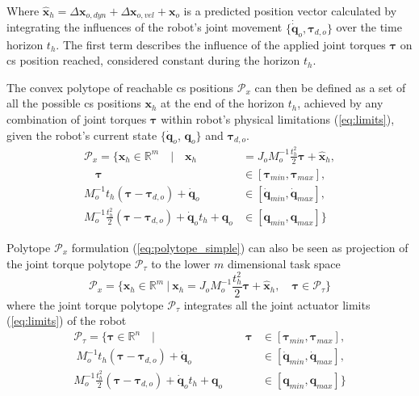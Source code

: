 Where $\hat{\bm{x}}_{h}\! =\!\Delta \bm{x}_{o,dyn}\! +\! \Delta \bm{x}_{o,vel} + \bm{x}_{o}$ is a predicted position vector calculated by integrating the influences of the robot's joint movement $\{\dot{\dot{\bm{q}}}_o,\bm{\tau}_{d,o}\}$ over the time horizon $t_h$. The first term describes the influence of the applied joint torques $\bm{\tau}$ on \gls{cs} position reached, considered constant during the horizon $t_h$.

The convex polytope of reachable \gls{cs} positions $\mathcal{P}_x$ can then be defined as a set of all the possible \gls{cs} positions $\bm{x}_{h}$ at the end of the horizon $t_h$, achieved by any combination of joint torques $\bm{\tau}$ within robot's physical limitations (\ref{eq:limits}), given the robot's current state $\{\dot{\bm{q}}_o$, $\bm{q}_o\}$ and $\bm{\tau}_{d,o}$.
\begin{equation}
\begin{split}
    \mathcal{P}_x= \{ \bm{x}_{h} \in \mathbb{R}^m \quad| \quad \bm{x}_{h} &= J_o M_o^{-1}\frac{t_h^2}{2}\bm{\tau} + \hat{\bm{x}}_{h},\\
    \quad \bm{\tau} &\in \left[\bm{\tau}_{min},\bm{\tau}_{max}\right],\\
   M_o^{-1}t_h (\bm{\tau} - \bm{\tau}_{d,o}) + \dot{\bm{q}}_o &\in \left[\dot{\bm{q}}_{min},\dot{\bm{q}}_{max}\right],\\
   M_o^{-1}\frac{t_h^2}{2}(\bm{\tau} - \bm{\tau}_{d,o}) +  \dot{\bm{q}}_ot_h + \bm{q}_o &\in \left[\bm{q}_{min},\bm{q}_{max}\right] \}
\end{split} 
\label{eq:polytope_simple}
\end{equation}

Polytope $\mathcal{P}_x$ formulation (\ref{eq:polytope_simple}) can also be seen as projection of the joint torque polytope $\mathcal{P}_\tau$ to the lower $m$ dimensional task space
\begin{equation}
    \mathcal{P}_x= \{ \bm{x}_{h} \in \mathbb{R}^m ~| ~ \bm{x}_{h} = J_o M_o^{-1}\frac{t_h^2}{2}\bm{\tau} + \hat{\bm{x}}_{h},\quad \bm{\tau}\in\mathcal{P}_\tau\}
\end{equation}
where the joint torque polytope $\mathcal{P}_\tau$ integrates all the joint actuator limits (\ref{eq:limits}) of the robot
\begin{equation}
\begin{split}
    \mathcal{P}_\tau= \{ \bm{\tau} \in \mathbb{R}^n \quad|\qquad\qquad\qquad\qquad \bm{\tau} &\in \left[\bm{\tau}_{min},\bm{\tau}_{max}\right],\\~
   M_o^{-1}t_h (\bm{\tau} - \bm{\tau}_{d,o}) + \dot{\bm{q}}_o &\in \left[\dot{\bm{q}}_{min},\dot{\bm{q}}_{max}\right],\\
   M_o^{-1}\frac{t_h^2}{2}(\bm{\tau} - \bm{\tau}_{d,o}) +  \dot{\bm{q}}_ot_h + \bm{q}_o &\in \left[\bm{q}_{min},\bm{q}_{max}\right] \}
\end{split} 
\label{eq:torqe_poly_rs}
\end{equation}

